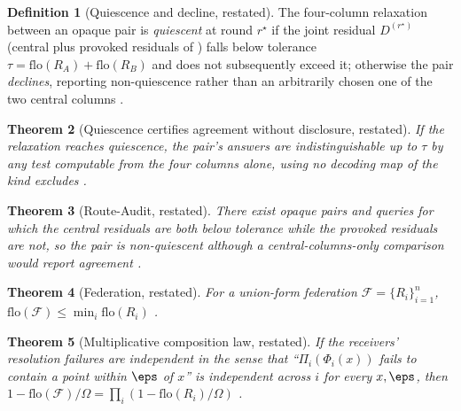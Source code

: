 \documentclass[11pt,twocolumn,a4paper]{article}
\theoremstyle{rdm}
\newtheorem{theorem}{Theorem}[section]
\theoremstyle{definition}
\newtheorem{definition}[theorem]{Definition}
\theoremstyle{remark}
\newcommand{\Om}{\Omega}
\newcommand{\flo}{\mathrm{flo}}
\newcommand{\Rec}{R}
\newcommand{\Fed}{\mathcal{F}}
\newcommand{\dem}{D}
\begin{document}
\begin{definition}[Quiescence and decline, restated]
\label{def:quiescence-recap}
\label{def:decline-recap}
The four-column relaxation between an opaque pair is \emph{quiescent} at
round $r^\star$ if the joint residual $\dem^{(r^\star)}$ (central plus
provoked residuals of \citet[Def.~8.3]{sachikonye-accountable-compilation})
falls below tolerance $\tau=\flo(\Rec_A)+\flo(\Rec_B)$ and does not
subsequently exceed it; otherwise the pair \emph{declines}, reporting
non-quiescence rather than an arbitrarily chosen one of the two central
columns \citep[Def.~8.4, Thm.~8.2]{sachikonye-accountable-compilation}.
\end{definition}

\begin{theorem}[Quiescence certifies agreement without disclosure, restated]
\label{thm:quiescence-formal-recap}
If the relaxation reaches quiescence, the pair's answers are
indistinguishable up to $\tau$ by any test computable from the four columns
alone, using no decoding map of the kind  excludes
\citep[Thm.~8.1]{sachikonye-accountable-compilation}.
\end{theorem}

\begin{theorem}[Route-Audit, restated]
\label{thm:route-audit-recap}
\label{thm:route-audit}
There exist opaque pairs and queries for which the central residuals are
both below tolerance while the provoked residuals are not, so the pair is
non-quiescent although a central-columns-only comparison would report
agreement \citep[Thm.~8.3]{sachikonye-accountable-compilation}.
\end{theorem}

\begin{theorem}[Federation, restated]
\label{thm:federation-recap}
For a union-form federation $\Fed=\{\Rec_i\}_{i=1}^n$,
$\flo(\Fed)\le\min_i\flo(\Rec_i)$
\citep[Thm.~6.2]{sachikonye-accountable-compilation}.
\end{theorem}

\begin{theorem}[Multiplicative composition law, restated]
\label{thm:mult-law-recap}
If the receivers' resolution failures are independent in the sense that
``$\Pi_i(\Phi_i(x))$ fails to contain a point within $\eps$ of $x$'' is
independent across $i$ for every $x,\eps$, then
$1-\flo(\Fed)/\Om=\prod_i(1-\flo(\Rec_i)/\Om)$
\citep[Thm.~6.3]{sachikonye-accountable-compilation}.
\end{theorem}
\end{document}
